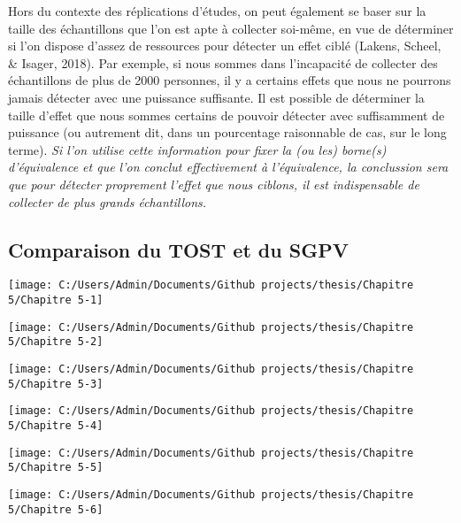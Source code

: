 \documentclass[
  12pt,
  french,
]{article}
\begin{document}
Hors du contexte des réplications d'études, on peut également se baser
sur la taille des échantillons que l'on est apte à collecter soi-même,
en vue de déterminer si l'on dispose d'assez de ressources pour détecter
un effet ciblé (Lakens, Scheel, \& Isager, 2018). Par exemple, si nous
sommes dans l'incapacité de collecter des échantillons de plus de 2000
personnes, il y a certains effets que nous ne pourrons jamais détecter
avec une puissance suffisante. Il est possible de déterminer la taille
d'effet que nous sommes certains de pouvoir détecter avec suffisamment
de puissance (ou autrement dit, dans un pourcentage raisonnable de cas,
sur le long terme). \emph{Si l'on utilise cette information pour fixer
la (ou les) borne(s) d'équivalence et que l'on conclut effectivement à
l'équivalence, la conclussion sera que pour détecter proprement l'effet
que nous ciblons, il est indispensable de collecter de plus grands
échantillons.}

\hypertarget{comparaison-du-tost-et-du-sgpv}{%
\subsection{Comparaison du TOST et du
SGPV}\label{comparaison-du-tost-et-du-sgpv}}

\begin{center}\texttt{[image: C:/Users/Admin/Documents/Github projects/thesis/Chapitre 5/Chapitre 5-1]} \end{center}

\begin{center}\texttt{[image: C:/Users/Admin/Documents/Github projects/thesis/Chapitre 5/Chapitre 5-2]} \end{center}

\begin{center}\texttt{[image: C:/Users/Admin/Documents/Github projects/thesis/Chapitre 5/Chapitre 5-3]} \end{center}

\begin{center}\texttt{[image: C:/Users/Admin/Documents/Github projects/thesis/Chapitre 5/Chapitre 5-4]} \end{center}

\begin{center}\texttt{[image: C:/Users/Admin/Documents/Github projects/thesis/Chapitre 5/Chapitre 5-5]} \end{center}

\begin{center}\texttt{[image: C:/Users/Admin/Documents/Github projects/thesis/Chapitre 5/Chapitre 5-6]} \end{center}
\end{document}
